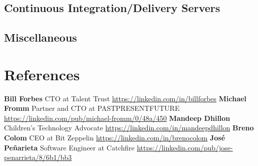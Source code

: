 \documentclass[11pt,a4paper,english]{moderncv}
\begin{document}
\clearpage

\subsection{Continuous Integration/Delivery Servers}


\subsection{Miscellaneous}

\subsection{}

\section{References}
\cvlistitem
{
    \textbf{Bill Forbes}
    \newline{}
    CTO at Talent Trust
    \newline{}
    \url{https://linkedin.com/in/billforbes}
}
\cvlistitem
{
    \textbf{Michael Fromm}
    \newline{}
    Partner and CTO at PASTPRESENTFUTURE
    \newline{}
    \url{https://linkedin.com/pub/michael-fromm/0/48a/450}
}
\cvlistitem
{
    \textbf{Mandeep Dhillon}
    \newline{}
    Children's Technology Advocate 
    \newline{}
    \url{https://linkedin.com/in/mandeepdhillon}
}
\cvlistitem
{
    \textbf{Breno Colom}
    \newline{}
    CEO at Bit Zeppelin
    \newline{}
    \url{https://linkedin.com/in/brenocolom}
}
\cvlistitem
{
    \textbf{José Peñarieta}
    \newline{}
    Software Engineer at Catchfire
    \newline{}
    \url{https://linkedin.com/pub/jose-penarrieta/8/6b1/bb3}
}
\end{document}
